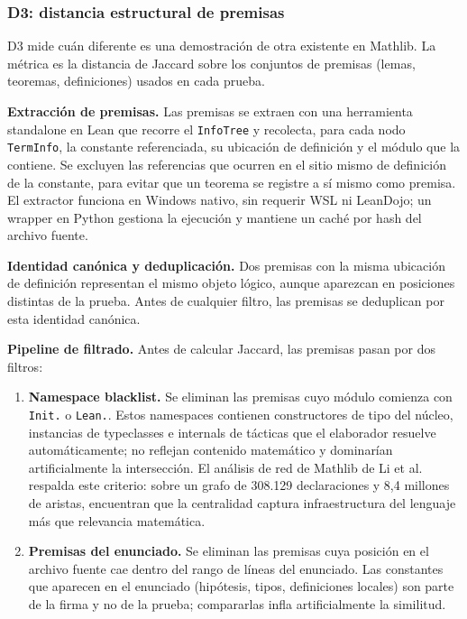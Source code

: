 \documentclass[12pt,a4paper]{article}
\theoremstyle{remark}
\begin{document}
\subsubsection{D3: distancia estructural de premisas}

D3 mide cuán diferente es una demostración de otra existente en Mathlib. La métrica es la distancia de Jaccard sobre los conjuntos de premisas (lemas, teoremas, definiciones) usados en cada prueba.

\textbf{Extracción de premisas.} Las premisas se extraen con una herramienta standalone en Lean que recorre el \texttt{InfoTree} y recolecta, para cada nodo \texttt{TermInfo}, la constante referenciada, su ubicación de definición y el módulo que la contiene. Se excluyen las referencias que ocurren en el sitio mismo de definición de la constante, para evitar que un teorema se registre a sí mismo como premisa. El extractor funciona en Windows nativo, sin requerir WSL ni LeanDojo; un wrapper en Python gestiona la ejecución y mantiene un caché por hash del archivo fuente.

\textbf{Identidad canónica y deduplicación.} Dos premisas con la misma ubicación de definición representan el mismo objeto lógico, aunque aparezcan en posiciones distintas de la prueba. Antes de cualquier filtro, las premisas se deduplican por esta identidad canónica.

\textbf{Pipeline de filtrado.} Antes de calcular Jaccard, las premisas pasan por dos filtros:

\begin{enumerate}
\item \textbf{Namespace blacklist.} Se eliminan las premisas cuyo módulo comienza con \texttt{Init.} o \texttt{Lean.}. Estos namespaces contienen constructores de tipo del núcleo, instancias de typeclasses e internals de tácticas que el elaborador resuelve automáticamente; no reflejan contenido matemático y dominarían artificialmente la intersección. El análisis de red de Mathlib de Li et al.~\cite{network2026} respalda este criterio: sobre un grafo de 308.129 declaraciones y 8,4 millones de aristas, encuentran que la centralidad captura infraestructura del lenguaje más que relevancia matemática.

\item \textbf{Premisas del enunciado.} Se eliminan las premisas cuya posición en el archivo fuente cae dentro del rango de líneas del enunciado. Las constantes que aparecen en el enunciado (hipótesis, tipos, definiciones locales) son parte de la firma y no de la prueba; compararlas infla artificialmente la similitud.
\end{enumerate}
\end{document}
